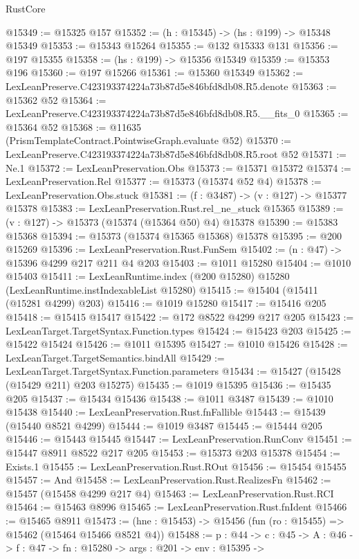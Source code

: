 \begin{lexlean}{RustCore}
\begin{coremodule}
@15349 := @15325 @157
@15352 := (h : @15345) -> (hs : @199) -> @15348 @15349
@15353 := @15343 @15264
@15355 := @132 @15333 @131
@15356 := @197 @15355
@15358 := (hs : @199) -> @15356 @15349
@15359 := @15353 @196
@15360 := @197 @15266
@15361 := @15360 @15349
@15362 := LexLeanPreserve.C423193374224a73b87d5e846bfd8db08.R5.denote
@15363 := @15362 @52
@15364 := LexLeanPreserve.C423193374224a73b87d5e846bfd8db08.R5.__fits_0
@15365 := @15364 @52
@15368 := @11635 (PrismTemplateContract.PointwiseGraph.evaluate @52)
@15370 := LexLeanPreserve.C423193374224a73b87d5e846bfd8db08.R5.root @52
@15371 := Ne.{1}
@15372 := LexLeanPreservation.Obs
@15373 := @15371 @15372
@15374 := LexLeanPreservation.Rel
@15377 := @15373 (@15374 @52 @4)
@15378 := LexLeanPreservation.Obs.stuck
@15381 := (f : @3487) -> (v : @127) -> @15377 @15378
@15383 := LexLeanPreservation.Rust.rel_ne_stuck @15365
@15389 := (v : @127) -> @15373 (@15374 (@15364 @50) @4) @15378
@15390 := @15383 @15368
@15394 := @15373 (@15374 @15365 @15368) @15378
@15395 := @200 @15269
@15396 := LexLeanPreservation.Rust.FunSem
@15402 := (n : @47) -> @15396 @4299 @217 @211 @4 @203
@15403 := @1011 @15280
@15404 := @1010 @15403
@15411 := LexLeanRuntime.index (@200 @15280) @15280 (LexLeanRuntime.instIndexableList @15280)
@15415 := @15404 (@15411 (@15281 @4299) @203)
@15416 := @1019 @15280
@15417 := @15416 @205
@15418 := @15415 @15417
@15422 := @172 @8522 @4299 @217 @205
@15423 := LexLeanTarget.TargetSyntax.Function.types
@15424 := @15423 @203
@15425 := @15422 @15424
@15426 := @1011 @15395
@15427 := @1010 @15426
@15428 := LexLeanTarget.TargetSemantics.bindAll
@15429 := LexLeanTarget.TargetSyntax.Function.parameters
@15434 := @15427 (@15428 (@15429 @211) @203 @15275)
@15435 := @1019 @15395
@15436 := @15435 @205
@15437 := @15434 @15436
@15438 := @1011 @3487
@15439 := @1010 @15438
@15440 := LexLeanPreservation.Rust.fnFallible
@15443 := @15439 (@15440 @8521 @4299)
@15444 := @1019 @3487
@15445 := @15444 @205
@15446 := @15443 @15445
@15447 := LexLeanPreservation.RunConv
@15451 := @15447 @8911 @8522 @217 @205
@15453 := @15373 @203 @15378
@15454 := Exists.{1}
@15455 := LexLeanPreservation.Rust.ROut
@15456 := @15454 @15455
@15457 := And
@15458 := LexLeanPreservation.Rust.RealizesFn
@15462 := @15457 (@15458 @4299 @217 @4)
@15463 := LexLeanPreservation.Rust.RCI
@15464 := @15463 @8996
@15465 := LexLeanPreservation.Rust.fnIdent
@15466 := @15465 @8911
@15473 := (hne : @15453) -> @15456 (fun (ro : @15455) => @15462 (@15464 @15466 @8521 @4))
@15488 := {p : @44} ->
  {c : @45} ->
  {A : @46} ->
  {f : @47} ->
  {fn : @15280} ->
  {args : @201} ->
  {env : @15395} ->

\end{coremodule}
\end{lexlean}
